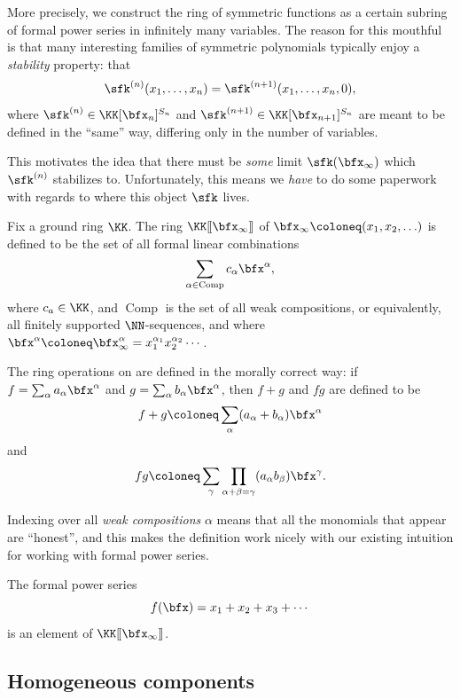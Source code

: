 \documentclass{article}
\newcommand{\lrBrack}[1]{[\kern-1.2pt[ {#1} ]\kern-1.2pt]}
\newcommand{\fps}[2]{#1 \lrBrack{#2}}
\newcommand{\pring}[2]{#1 [ {#2} ]}
\DeclareMathOperator{\Com}{Comp}
\begin{document}
More precisely, we construct the ring of symmetric functions as a certain subring of formal power series in infinitely many variables.
The reason for this mouthful is that many interesting families of symmetric polynomials typically enjoy a \textit{stability} property: that
\[
    \sfk^{(n)}(x_1,\ldots,x_n)
    =
    \sfk^{(n+1)}(x_1,\ldots,x_n, 0),
\]
where $\sfk^{(n)} \in \pring{\KK}{\bfx_n}^{S_n}$ and $\sfk^{(n+1)} \in \pring{\KK}{\bfx_{n+1}}^{S_n}$ are meant to be defined in the ``same'' way, differing only in the number of variables.

This motivates the idea that there must be \textit{some} limit $\sfk(\bfx_\infty)$ which $\sfk^{(n)}$ stabilizes to.
Unfortunately, this means we \textit{have} to do some paperwork with regards to where this object $\sfk$ lives.

\begin{definition}
    Fix a ground ring $\KK$.
    The ring $\fps{\KK}{\bfx_\infty}$ of  $\bfx_\infty \coloneq (x_1, x_2, \ldots)$ is defined to be the set of all formal linear combinations 
    \[
        \sum_{\alpha\in\Com} c_\alpha \bfx^\alpha,
    \]
    where $c_a \in \KK$, and $\Com$ is the set of all weak compositions, or equivalently, all finitely supported $\NN$-sequences, and where $\bfx^\alpha \coloneq \bfx_\infty^\alpha = x_1^{\alpha_1}x_2^{\alpha_2}\cdots$.

    The ring operations on are defined in the morally correct way:
    if $f = \sum_\alpha a_\alpha \bfx^\alpha$ and $g = \sum_\alpha b_\alpha \bfx^\alpha$, then $f + g$ and $fg$ are defined to be
    \[
        f+g
        \coloneq
        \sum_\alpha
        (a_\alpha+b_\alpha)\bfx^\alpha
    \]
    and
    \[
        fg
        \coloneq
        \sum_\gamma \prod_{\alpha+\beta=\gamma}
        (a_\alpha b_\beta) \bfx^\gamma.
    \]
\end{definition}

Indexing over all \textit{weak compositions} $\alpha$ means that all the monomials that appear are ``honest'', and this makes the definition work nicely with our existing intuition for working with formal power series.

\begin{example}
    The formal power series
    \[
        f(\bfx)
        =
        x_1 + x_2 + x_3 + \cdots
    \]
    is an element of $\fps{\KK}{\bfx_\infty}$.
\end{example}

\subsection{Homogeneous components}
\end{document}
